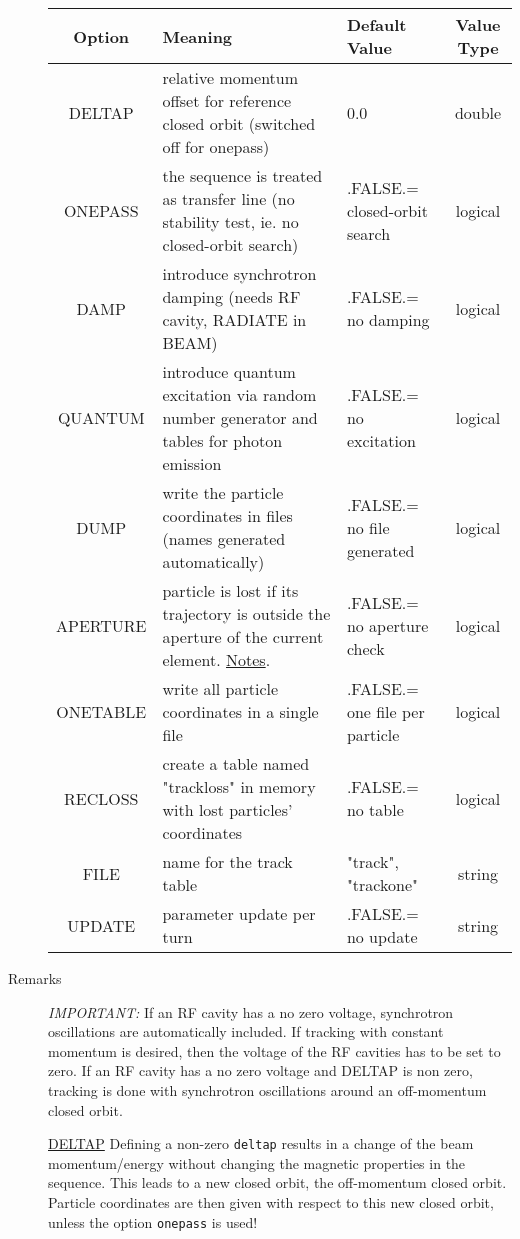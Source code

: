\begin{description}
\begin{tabular}{c p{5cm} p{3cm} c}
\hline 
\textbf{Option} & \textbf{Meaning} & \textbf{Default Value} & \textbf{Value Type} \\ 
\hline
DELTAP & relative momentum offset for reference closed orbit (switched off for onepass) &  0.0 & double \\ 
\hline
ONEPASS & the sequence is treated as transfer line (no stability test, ie. no closed-orbit search) & .FALSE.= closed-orbit search & logical \\ 
\hline
DAMP & introduce synchrotron damping (needs RF cavity, RADIATE in BEAM)  & .FALSE.= no damping & logical \\ 
\hline
QUANTUM & introduce quantum excitation via random number generator and tables for photon emission & .FALSE.= no excitation & logical \\ 
\hline
DUMP & write the particle coordinates in files (names generated automatically)  & .FALSE.= no file generated & logical \\ 
\hline
APERTURE & particle is lost if its trajectory is outside the aperture of the current element. \hyperlink{track:remarks:aperture:notes}{Notes}. & .FALSE.= no aperture check & logical \\ 
\hline
ONETABLE & write all particle coordinates in a single file & .FALSE.= one file per particle & logical \\ 
\hline
RECLOSS & create a table named "trackloss" in memory with lost particles' coordinates & .FALSE.= no table & logical \\ 
\hline
FILE & name for the track table   & "track", "trackone" & string \\ 
\hline
UPDATE & parameter update per turn   & .FALSE.= no update & string \\ 
\hline
\end{tabular}

	\item[Remarks] \emph{IMPORTANT:} If an RF cavity has a no zero voltage, synchrotron
             oscillations are automatically included. If tracking with constant
             momentum is desired, then the voltage of the RF cavities has to be set
             to zero. If an RF cavity has a no zero voltage and DELTAP is non zero, 
             tracking is done with synchrotron oscillations around an off-momentum
             closed orbit.
             

\href{track:remarks:deltap:notes}{DELTAP}
             Defining a non-zero \texttt{deltap} results in a change of the 
             beam momentum/energy without changing the magnetic properties in the sequence. This 
             leads to a new closed orbit, the off-momentum closed orbit. Particle coordinates are
             then given with respect to this new closed orbit, unless the option \texttt{onepass}
             is used!
\\


\end{description}
